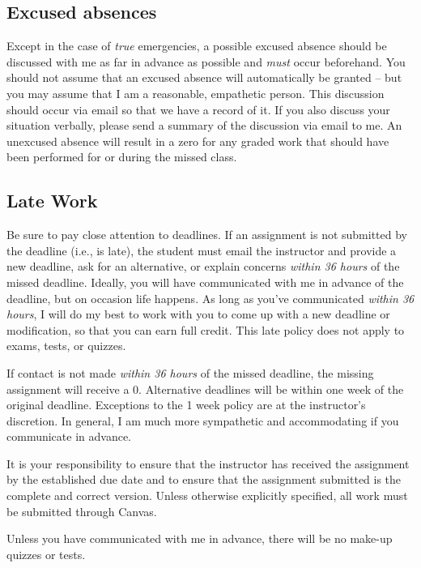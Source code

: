 \documentclass[
]{book}
\begin{document}
\hypertarget{excused-absences}{%
\subsection{Excused absences}\label{excused-absences}}

Except in the case of \emph{true} emergencies, a possible excused absence should be discussed with me as far in advance as possible and \emph{must} occur beforehand.
You should not assume that an excused absence will automatically be granted -- but you may assume that I am a reasonable, empathetic person.
This discussion should occur via email so that we have a record of it.
If you also discuss your situation verbally, please send a summary of the discussion via email to me.
An unexcused absence will result in a zero for any graded work that should have been performed for or during the missed class.

\hypertarget{late-work}{%
\subsection{Late Work}\label{late-work}}

Be sure to pay close attention to deadlines.
If an assignment is not submitted by the deadline (i.e., is late), the student must email the instructor and provide a new deadline, ask for an alternative, or explain concerns \emph{within 36 hours} of the missed deadline.
Ideally, you will have communicated with me in advance of the deadline, but on occasion life happens.
As long as you've communicated \emph{within 36 hours}, I will do my best to work with you to come up with a new deadline or modification, so that you can earn full credit.
This late policy does not apply to exams, tests, or quizzes.

If contact is not made \emph{within 36 hours} of the missed deadline, the missing assignment will receive a 0.
Alternative deadlines will be within one week of the original deadline.
Exceptions to the 1 week policy are at the instructor's discretion.
In general, I am much more sympathetic and accommodating if you communicate in advance.

It is your responsibility to ensure that the instructor has received the assignment by the established due date and to ensure that the assignment submitted is the complete and correct version.
Unless otherwise explicitly specified, all work must be submitted through Canvas.

Unless you have communicated with me in advance, there will be no make-up quizzes or tests.
\end{document}
